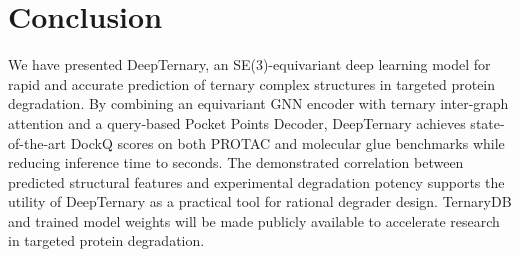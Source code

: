 \documentclass[11pt]{article}
\begin{document}
\section{Conclusion}

We have presented DeepTernary, an SE(3)-equivariant deep learning model for rapid and accurate prediction of ternary complex structures in targeted protein degradation. By combining an equivariant GNN encoder with ternary inter-graph attention and a query-based Pocket Points Decoder, DeepTernary achieves state-of-the-art DockQ scores on both PROTAC and molecular glue benchmarks while reducing inference time to seconds. The demonstrated correlation between predicted structural features and experimental degradation potency supports the utility of DeepTernary as a practical tool for rational degrader design. TernaryDB and trained model weights will be made publicly available to accelerate research in targeted protein degradation.



\end{document}
